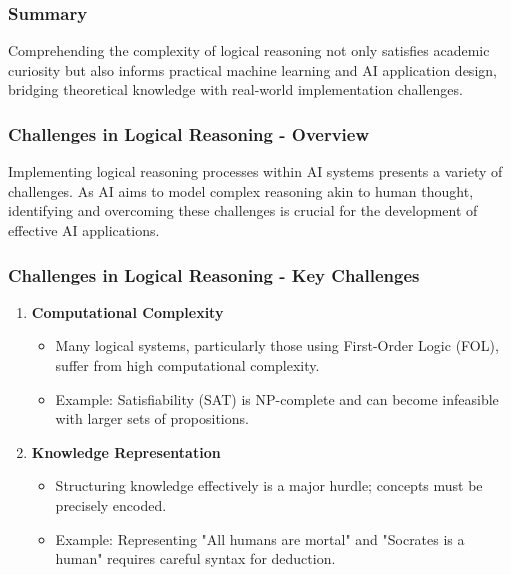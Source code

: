 \documentclass[aspectratio=169]{beamer}
\begin{document}
\begin{frame}[fragile]
    \frametitle{Summary}
    Comprehending the complexity of logical reasoning not only satisfies academic curiosity but also informs practical machine learning and AI application design, bridging theoretical knowledge with real-world implementation challenges.
\end{frame}

\begin{frame}[fragile]
    \frametitle{Challenges in Logical Reasoning - Overview}
    Implementing logical reasoning processes within AI systems presents a variety of challenges. 
    As AI aims to model complex reasoning akin to human thought, identifying and overcoming these challenges is crucial for the development of effective AI applications.
\end{frame}

\begin{frame}[fragile]
    \frametitle{Challenges in Logical Reasoning - Key Challenges}
    \begin{enumerate}
        \item \textbf{Computational Complexity}
        \begin{itemize}
            \item Many logical systems, particularly those using First-Order Logic (FOL), suffer from high computational complexity.
            \item Example: Satisfiability (SAT) is NP-complete and can become infeasible with larger sets of propositions.
        \end{itemize}

        \item \textbf{Knowledge Representation}
        \begin{itemize}
            \item Structuring knowledge effectively is a major hurdle; concepts must be precisely encoded.
            \item Example: Representing "All humans are mortal" and "Socrates is a human" requires careful syntax for deduction.
        \end{itemize}
    \end{enumerate}
\end{frame}
\end{document}
